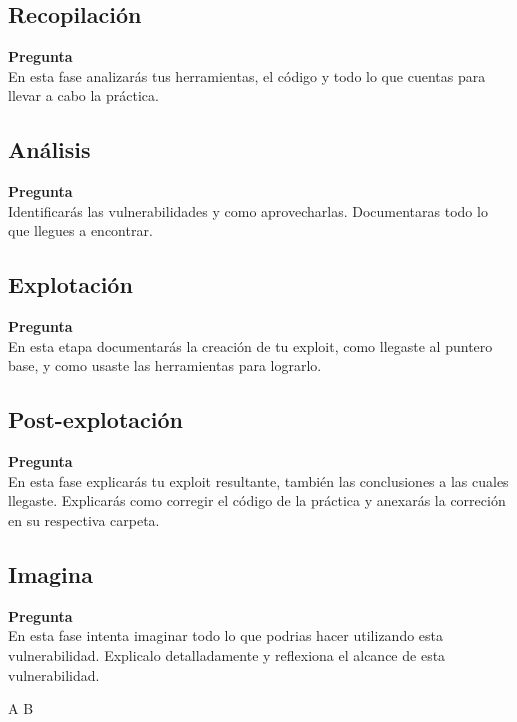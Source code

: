 \documentclass{article}
\newenvironment{problem}[2][Pregunta]
    { \begin{mdframed}[backgroundcolor=gray!20] \textbf{#1 #2} \\}
    {  \end{mdframed}}
\begin{document}
\subsection{Recopilación}

\begin{problem}{}
  En esta fase analizarás tus herramientas, el código y todo
  lo que cuentas para llevar a cabo la práctica.
\end{problem}


\subsection{Análisis}

\begin{problem}
  {} Identificarás las vulnerabilidades y como aprovecharlas. Documentaras
  todo lo que llegues a encontrar.
\end{problem}


\subsection{Explotación}

\begin{problem}
  {} En esta etapa documentarás la creación de tu exploit, como llegaste al puntero
  base, y como usaste las herramientas para lograrlo.
\end{problem}

\subsection{Post-explotación}

\begin{problem}
  {} En esta fase explicarás tu exploit resultante, también las conclusiones
  a las cuales llegaste. Explicarás como corregir el código de la práctica y anexarás la
  correción en su respectiva carpeta.
\end{problem}

\subsection{Imagina}

\begin{problem}{}
  En esta fase intenta imaginar todo lo que podrias hacer utilizando esta vulnerabilidad.
  Explicalo detalladamente y reflexiona el alcance de esta vulnerabilidad.
\end{problem}


\begin{thebibliography}{2} %
\bibitem{} A
\bibitem{} B
\end{thebibliography}
\end{document}
